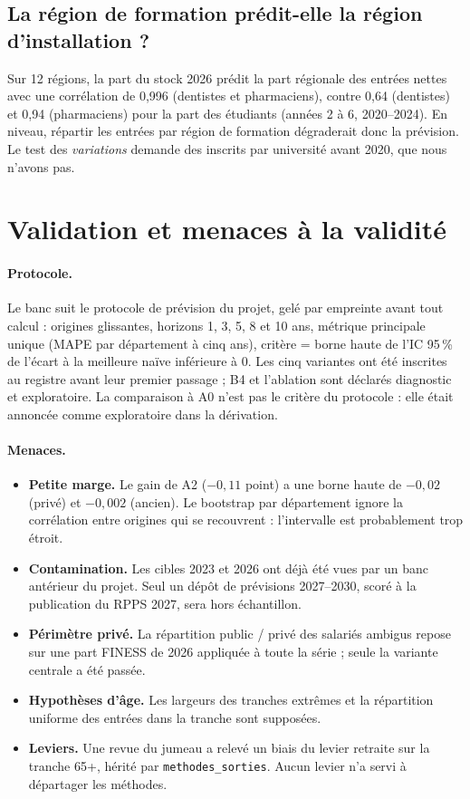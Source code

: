 \documentclass[11pt]{article}
\begin{document}
\subsection{La région de formation prédit-elle la région d'installation ?}
Sur 12 régions, la part du stock 2026 prédit la part régionale des entrées nettes avec une
corrélation de 0,996\mesure{} (dentistes et pharmaciens), contre 0,64\mesure{} (dentistes) et
0,94\mesure{} (pharmaciens) pour la part des étudiants (années 2 à 6, 2020--2024). En niveau, répartir
les entrées par région de formation dégraderait donc la prévision. Le test des \emph{variations}
demande des inscrits par université avant 2020, que nous n'avons pas.

\section{Validation et menaces à la validité}
\paragraph{Protocole.} Le banc suit le protocole de prévision du projet, gelé par empreinte avant tout
calcul : origines glissantes, horizons 1, 3, 5, 8 et 10 ans, métrique principale unique (MAPE par
département à cinq ans), critère = borne haute de l'IC 95\,\% de l'écart à la meilleure naïve
inférieure à 0. Les cinq variantes ont été inscrites au registre avant leur premier passage ; B4 et
l'ablation sont déclarés diagnostic et exploratoire. La comparaison à A0 n'est pas le critère du
protocole : elle était annoncée comme exploratoire dans la dérivation.

\paragraph{Menaces.}
\begin{itemize}
  \item \textbf{Petite marge.} Le gain de A2 ($-0{,}11$ point) a une borne haute de $-0{,}02$ (privé)
        et $-0{,}002$ (ancien). Le bootstrap par département ignore la corrélation entre origines qui
        se recouvrent : l'intervalle est probablement trop étroit\suppose.
  \item \textbf{Contamination.} Les cibles 2023 et 2026 ont déjà été vues par un banc antérieur du
        projet. Seul un dépôt de prévisions 2027--2030, scoré à la publication du RPPS 2027, sera hors
        échantillon.
  \item \textbf{Périmètre privé.} La répartition public / privé des salariés ambigus repose sur une
        part FINESS de 2026 appliquée à toute la série ; seule la variante centrale a été passée.
  \item \textbf{Hypothèses d'âge.} Les largeurs des tranches extrêmes et la répartition uniforme des
        entrées dans la tranche sont supposées.
  \item \textbf{Leviers.} Une revue du jumeau a relevé un biais du levier retraite sur la tranche 65+,
        hérité par \texttt{methodes\_sorties}. Aucun levier n'a servi à départager les méthodes.
\end{itemize}
\end{document}

